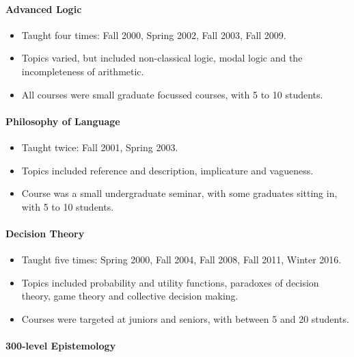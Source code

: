 \documentclass[
  10pt,
  letterpaper,
  DIV=11,
  numbers=noendperiod,
  twoside]{scrartcl}
\let\oldparagraph\paragraph
\renewcommand{\paragraph}[1]{\oldparagraph{#1}\mbox{}}
\providecommand{\tightlist}{%
  \setlength{\itemsep}{0pt}\setlength{\parskip}{0pt}}\usepackage{longtable,booktabs,array}
\begin{document}
\paragraph{Advanced Logic}\label{advanced-logic}

\begin{itemize}
\tightlist
\item
  Taught four times: Fall 2000, Spring 2002, Fall 2003, Fall 2009.
\item
  Topics varied, but included non-classical logic, modal logic and the
  incompleteness of arithmetic.
\item
  All courses were small graduate focussed courses, with 5 to 10
  students.
\end{itemize}

\paragraph{Philosophy of Language}\label{philosophy-of-language}

\begin{itemize}
\tightlist
\item
  Taught twice: Fall 2001, Spring 2003.
\item
  Topics included reference and description, implicature and vagueness.
\item
  Course was a small undergraduate seminar, with some graduates sitting
  in, with 5 to 10 students.
\end{itemize}

\paragraph{Decision Theory}\label{decision-theory}

\begin{itemize}
\tightlist
\item
  Taught five times: Spring 2000, Fall 2004, Fall 2008, Fall 2011,
  Winter 2016.
\item
  Topics included probability and utility functions, paradoxes of
  decision theory, game theory and collective decision making.
\item
  Courses were targeted at juniors and seniors, with between 5 and 20
  students.
\end{itemize}

\paragraph{300-level Epistemology}\label{level-epistemology}
\end{document}
